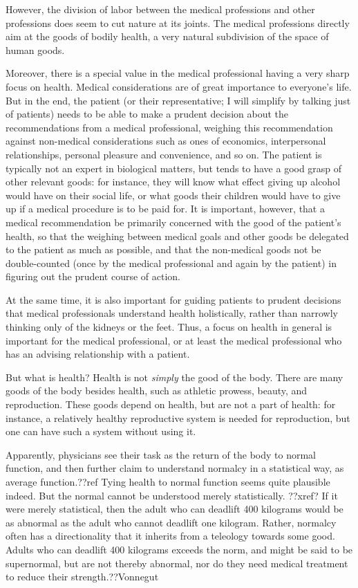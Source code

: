 However, the division of labor between the medical professions and other professions does seem to cut nature at its joints. The medical professions directly
aim at the goods of bodily health, a very natural subdivision of the space of human goods.

Moreover, there is a special value in the medical professional
having a very sharp focus on health. Medical considerations are of great importance to everyone's life. But in
the end, the patient (or their representative; I will simplify by talking just of patients) needs to be able to make a prudent decision about the recommendations
from a medical professional, weighing this recommendation against non-medical considerations such as ones of economics, interpersonal relationships, personal
pleasure and convenience, and so on. The patient is typically not an expert in biological matters, but tends to have a good grasp of other relevant goods:
for instance, they will know what effect giving up alcohol would have on their social life, or what goods their children would have to give up if a medical
procedure is to be paid for. It is important, however, that a medical recommendation be primarily concerned with the good of the patient's health, so that
the weighing between medical goals and other goods be delegated to the patient as much as possible, and that the non-medical goods not be double-counted (once by the
medical professional and again by the patient) in figuring out the prudent course of action.

At the same time, it is also important for guiding patients to prudent
decisions that medical professionals understand health holistically, rather than narrowly thinking only of the kidneys or the feet. Thus, a focus on health in general
is important for the medical professional, or at least the medical professional who has an advising relationship with a patient.

But what is health? Health is not \textit{simply} the good of the body. There are many goods of the body besides health, such as
athletic prowess, beauty, and reproduction. These goods depend on health, but are not a part of health: for instance, a relatively healthy reproductive system is needed for
reproduction, but one can have such a system without using it.

Apparently, physicians see their task as the return of the body to normal function, and then further claim to understand normalcy in a statistical way, as average
function.??ref Tying health to normal function seems quite plausible indeed. But the normal cannot be understood merely statistically. ??xref? If it were merely
statistical, then the adult who can deadlift 400 kilograms would be as abnormal
as the adult who cannot deadlift one kilogram. Rather, normalcy often has a directionality that it inherits from a teleology towards some good. Adults who
can deadlift 400 kilograms exceeds the norm, and might be said to be supernormal, but are not thereby abnormal, nor do they need medical treatment to reduce their
strength.??Vonnegut

